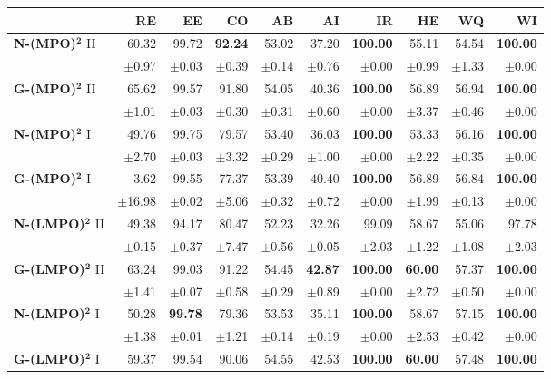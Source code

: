 \begin{table}[!htbp]
\centering
\scriptsize
\begin{tabular}{lrrrrr||rrrr}
\toprule
 & RE & EE & CO & AB & AI & IR & HE & WQ & WI \\
\midrule
\textbf{N-(MPO)}$\bm{^2}$ II & 60.32 & 99.72 & \textbf{92.24} & 53.02 & 37.20 & \textbf{100.00} & 55.11 & 54.54 & \textbf{100.00} \\
 & $\pm$0.97 & $\pm$0.03 & $\pm$0.39 & $\pm$0.14 & $\pm$0.76 & $\pm$0.00 & $\pm$0.99 & $\pm$1.33 & $\pm$0.00 \\
\midrule
\textbf{G-(MPO)}$\bm{^2}$ II & 65.62 & 99.57 & 91.80 & 54.05 & 40.36 & \textbf{100.00} & 56.89 & 56.94 & \textbf{100.00} \\
 & $\pm$1.01 & $\pm$0.03 & $\pm$0.30 & $\pm$0.31 & $\pm$0.60 & $\pm$0.00 & $\pm$3.37 & $\pm$0.46 & $\pm$0.00 \\
\midrule
\textbf{N-(MPO)}$\bm{^2}$ I & 49.76 & 99.75 & 79.57 & 53.40 & 36.03 & \textbf{100.00} & 53.33 & 56.16 & \textbf{100.00} \\
 & $\pm$2.70 & $\pm$0.03 & $\pm$3.32 & $\pm$0.29 & $\pm$1.00 & $\pm$0.00 & $\pm$2.22 & $\pm$0.35 & $\pm$0.00 \\
\midrule
\textbf{G-(MPO)}$\bm{^2}$ I & 3.62 & 99.55 & 77.37 & 53.39 & 40.40 & \textbf{100.00} & 56.89 & 56.84 & \textbf{100.00} \\
 & $\pm$16.98 & $\pm$0.02 & $\pm$5.06 & $\pm$0.32 & $\pm$0.72 & $\pm$0.00 & $\pm$1.99 & $\pm$0.13 & $\pm$0.00 \\
\midrule
\textbf{N-(LMPO)}$\bm{^2}$ II & 49.38 & 94.17 & 80.47 & 52.23 & 32.26 & 99.09 & 58.67 & 55.06 & 97.78 \\
 & $\pm$0.15 & $\pm$0.37 & $\pm$7.47 & $\pm$0.56 & $\pm$0.05 & $\pm$2.03 & $\pm$1.22 & $\pm$1.08 & $\pm$2.03 \\
\midrule
\textbf{G-(LMPO)}$\bm{^2}$ II & 63.24 & 99.03 & 91.22 & 54.45 & \textbf{42.87} & \textbf{100.00} & \textbf{60.00} & 57.37 & \textbf{100.00} \\
 & $\pm$1.41 & $\pm$0.07 & $\pm$0.58 & $\pm$0.29 & $\pm$0.89 & $\pm$0.00 & $\pm$2.72 & $\pm$0.50 & $\pm$0.00 \\
\midrule
\textbf{N-(LMPO)}$\bm{^2}$ I & 50.28 & \textbf{99.78} & 79.36 & 53.53 & 35.11 & \textbf{100.00} & 58.67 & 57.15 & \textbf{100.00} \\
 & $\pm$1.38 & $\pm$0.01 & $\pm$1.21 & $\pm$0.14 & $\pm$0.19 & $\pm$0.00 & $\pm$2.53 & $\pm$0.42 & $\pm$0.00 \\
\midrule
\textbf{G-(LMPO)}$\bm{^2}$ I & 59.37 & 99.54 & 90.06 & 54.55 & 42.53 & \textbf{100.00} & \textbf{60.00} & 57.48 & \textbf{100.00} \\

\end{tabular}
\end{table}
